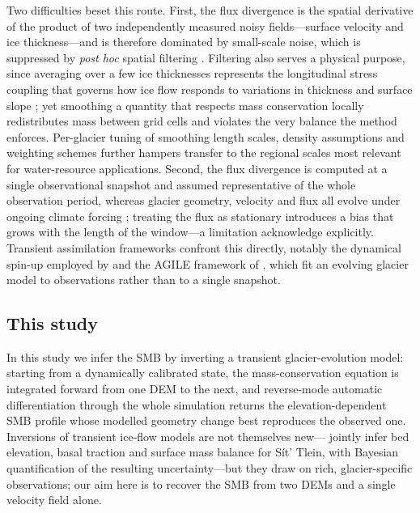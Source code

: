 Two difficulties beset this route. First, the flux divergence is the spatial derivative of the product of two independently measured noisy fields---surface velocity and ice thickness---and is therefore dominated by small-scale noise, which is suppressed by \emph{post hoc} spatial filtering \citep{vantricht2021, bisset2020}. Filtering also serves a physical purpose, since averaging over a few ice thicknesses represents the longitudinal stress coupling that governs how ice flow responds to variations in thickness and surface slope \citep{kamb1986, enderlin2016}; yet smoothing a quantity that respects mass conservation locally redistributes mass between grid cells and violates the very balance the method enforces. Per-glacier tuning of smoothing length scales, density assumptions and weighting schemes further hampers transfer to the regional scales most relevant for water-resource applications.
Second, the flux divergence is computed at a single observational snapshot and assumed representative of the whole observation period, whereas glacier geometry, velocity and flux all evolve under ongoing climate forcing \citep{johannesson1989, zekollari2015}; treating the flux as stationary introduces a bias that grows with the length of the window---a limitation \citet{kneib2024} acknowledge explicitly. Transient assimilation frameworks confront this directly, notably the dynamical spin-up employed by \citet{hartl2025} and the AGILE framework of \citet{schmitt2026}, which fit an evolving glacier model to observations rather than to a single snapshot.

\subsection{This study}\label{sec:contribution}
In this study we infer the SMB by inverting a transient glacier-evolution model: starting from a dynamically calibrated state, the mass-conservation equation is integrated forward from one DEM to the next, and reverse-mode automatic differentiation through the whole simulation returns the elevation-dependent SMB profile whose modelled geometry change best reproduces the observed one. Inversions of transient ice-flow models are not themselves new---\citet{brinkerhoff2025} jointly infer bed elevation, basal traction and surface mass balance for Sít' Tlein, with Bayesian quantification of the resulting uncertainty---but they draw on rich, glacier-specific observations; our aim here is to recover the SMB from two DEMs and a single velocity field alone.

